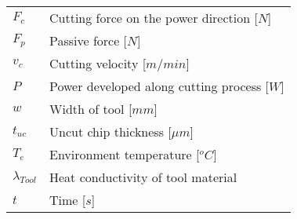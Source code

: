 \begin{longtable}{ll}
$F_{c}$ & Cutting force on the power direction [$N$]\\
$F_{p}$ & Passive force [$N$]\\
$v_{c}$ & Cutting velocity [$m/min$]\\
$P$ & Power developed along cutting process [$W$]\\
$w$ & Width of tool [$mm$]\\
$t_{uc}$ & Uncut chip thickness [$\mu$$m$]\\
$T_{e}$ & Environment temperature [$^{o}C$]\\
$\lambda_{Tool}$ & Heat conductivity of tool material\\
$t$ & Time [$s$]\\
\end{longtable}

